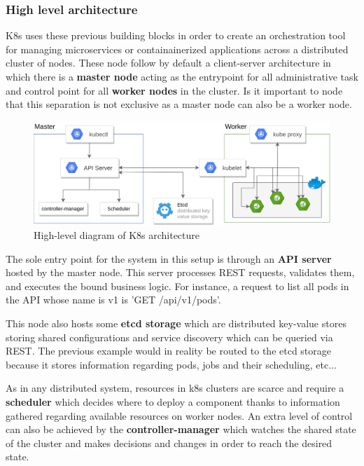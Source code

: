 \documentclass[11pt]{article}
\begin{document}
\subsubsection{High level architecture} \label{sec:high}

\hspace{5mm} K8s uses these previous building blocks in order to create an orchestration tool for managing microservices or containainerized applications across a distributed cluster of nodes. These node follow by default a client-server architecture in which there is a \textbf{master node} acting as the entrypoint for all administrative task and control point for all \textbf{worker nodes} in the cluster. Is it important to node that this separation is not exclusive as a master node can also be a worker node. 


\begin{figure}[h]
    \centering
    \includegraphics[width=\textwidth]{k8s_infrastructure.png}
    \caption{High-level diagram of K8s architecture}
    \label{fig:k8s_infrastructure}
\end{figure}


\vspace{-5mm}\hspace{5mm} The sole entry point for the system in this setup is through an \textbf{API server} hosted by the master node. This server processes REST requests, validates them, and executes the bound business logic. For instance, a request to list all pods in the API whose name is v1 is 'GET /api/v1/pods'. 

This node also hosts some \textbf{etcd storage} which are distributed key-value stores storing shared configurations and service discovery which can be queried via REST. The previous example would in reality be routed to the etcd storage because it stores information regarding pods, jobs and their scheduling, etc...

As in any distributed system, resources in k8s clusters are scarce and require a \textbf{scheduler} which decides where to deploy a component thanks to information gathered regarding available resources on worker nodes. An extra level of control can also be achieved by the \textbf{controller-manager} which watches the shared state of the cluster and makes decisions and changes in order to reach the desired state. 
\end{document}
